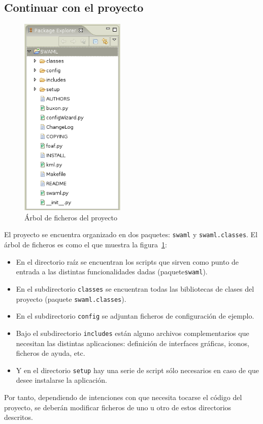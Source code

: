 \subsection*{Continuar con el proyecto}

\begin{figure}[H]
	\centering
	\includegraphics[width=5cm]{images/screenshots/package-explorer.png}
	\caption{Árbol de ficheros del proyecto}
	\label{fig:package-explorer}
\end{figure}

El proyecto se encuentra organizado en dos paquetes: \texttt{swaml} y \texttt{swaml.classes}.
El árbol de ficheros es como el que muestra la figura~\ref{fig:package-explorer}:

\begin{itemize}
  \item En el directorio raíz se encuentran los scripts que sirven como punto de entrada
	a las distintas funcionalidades dadas (paquete\texttt{swaml}).
  \item En el subdirectorio \texttt{classes} se encuentran  todas las bibliotecas de clases
	del proyecto (paquete \texttt{swaml.classes}).
  \item En el subdirectorio \texttt{config} se adjuntan ficheros de configuración de ejemplo.
  \item Bajo el subdirectorio \texttt{includes} están alguno archivos complementarios
	que necesitan las distintas aplicaciones: definición de interfaces gráficas, iconos,
	ficheros de ayuda, etc.
  \item Y en el directorio \texttt{setup} hay una serie de script sólo necesarios en caso
	de que desee instalarse la aplicación.
\end{itemize}

Por tanto, dependiendo de intenciones con que necesita tocarse el código del proyecto,
se deberán modificar ficheros de uno u otro de estos directorios descritos.
